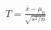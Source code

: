 \documentclass[10pt]{article}
\begin{document}
\begin{align*}T=\frac{\bar{x}-\mu_0}{\sqrt{s^2/n}}\end{align*}
\end{document}
